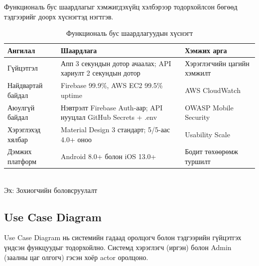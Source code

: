 Функциональ бус шаардлагыг хэмжигдэхүйц хэлбэрээр тодорхойлсон бөгөөд тэдгээрийг доорх хүснэгтэд нэгтгэв.

\begin{table}[h]
\centering
\caption{Функциональ бус шаардлагуудын хүснэгт}
\label{tab:nonfunctional}
\begin{tabularx}{\textwidth}{|p{2.8cm}|X|p{3cm}|}
\hline
\textbf{Ангилал} & \textbf{Шаардлага} & \textbf{Хэмжих арга} \\
\hline
Гүйцэтгэл & Апп 3 секундын дотор ачаалах; API хариулт 2 секундын дотор & Хэрэглэгчийн цагийн хэмжилт \\
\hline
Найдвартай байдал & Firebase 99.9\%, AWS EC2 99.5\% uptime & AWS CloudWatch \\
\hline
Аюулгүй байдал & Нэвтрэлт Firebase Auth-аар; API нууцлал GitHub Secrets + .env & OWASP Mobile Security \\
\hline
Хэрэглэхэд хялбар & Material Design 3 стандарт; 5/5-аас 4.0+ оноо & Usability Scale \\
\hline
Дэмжих платформ & Android 8.0+ болон iOS 13.0+ & Бодит төхөөрөмж туршилт \\
\hline
\end{tabularx}\\[4pt]
{\footnotesize Эх: Зохиогчийн боловсруулалт}
\end{table}

\subsection*{Use Case Diagram}

Use Case Diagram нь системийн гадаад оролцогч болон тэдгээрийн гүйцэтгэх үндсэн функцуудыг тодорхойлно. Системд хэрэглэгч (иргэн) болон Admin (заалны цаг олгогч) гэсэн хоёр actor оролцоно.

